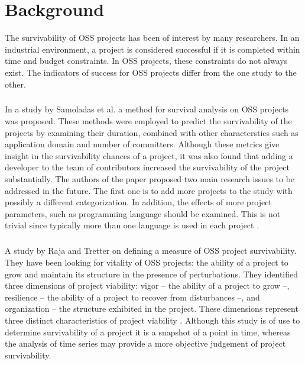 \chapter{Background}
\label{background}

The survivability of OSS projects has been of interest by many researchers. In
an industrial environment, a project is considered successful if it is completed
within time and budget constraints. In OSS projects, these constraints do not
always exist. The indicators of success for OSS projects differ from the one
study to the other.

\paragraph{}
In a study by Samoladas et al. a method for survival analysis on OSS projects
was proposed. These methods were employed to predict the survivability of the
projects by examining their duration, combined with other characterstics such
as application domain and number of committers. Although these metrics give
insight in the survivability chances of a project, it was also found that
adding a developer to the team of contributors increased the survivability of
the project substantially. The authors of the paper proposed two main research
issues to be addressed in the future. The first one is to add more projects to
the study with possibly a different categorization. In addition, the effects of
more project parameters, such as programming language should be examined. This
is not trivial since typically more than one language is used in each project
\cite{samoladas2010}.

\paragraph{}
A study by Raja and Tretter on defining a measure of OSS project survivability.
They have been looking for vitality of OSS projects: the ability of a project
to grow and maintain its structure in the presence of perturbations. They
identified three dimensions of project viability: vigor -- the ability of a
project to grow --, resilience -- the ability of a project to recover from
disturbances --, and organization -- the structure exhibited in the project.
These dimensions represent three distinct characteristics of project viability
\cite{raja2012}. Although this study is of use to determine survivability of a
project it is a snapshot of a point in time, whereas the analysis of time
series may provide a more objective judgement of project survivability.

